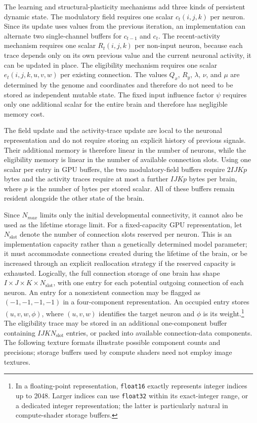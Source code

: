 \documentclass[12pt,a4paper]{article}
\begin{document}
	The learning and structural-plasticity mechanisms add three kinds of persistent dynamic state. The modulatory field requires one scalar $c_t(i,j,k)$ per neuron. Since its update uses values from the previous iteration, an implementation can alternate two single-channel buffers for $c_{t-1}$ and $c_t$. The recent-activity mechanism requires one scalar $R_t(i,j,k)$ per non-input neuron, because each trace depends only on its own previous value and the current neuronal activity, it can be updated in place. The eligibility mechanism requires one scalar $e_t(i,j,k,u,v,w)$ per existing connection. The values $Q_x$, $R_y$, $\lambda$, $\nu$, and $\mu$ are determined by the genome and coordinates and therefore do not need to be stored as independent mutable state. The fixed input influence factor $\psi$ requires only one additional scalar for the entire brain and therefore has negligible memory cost.

	The field update and the activity-trace update are local to the neuronal representation and do not require storing an explicit history of previous signals. Their additional memory is therefore linear in the number of neurons, while the eligibility memory is linear in the number of available connection slots. Using one scalar per entry in GPU buffers, the two modulatory-field buffers require $2IJKp$ bytes and the activity traces require at most a further $IJKp$ bytes per brain, where $p$ is the number of bytes per stored scalar. All of these buffers remain resident alongside the other state of the brain.

	Since $N_{max}$ limits only the initial developmental connectivity, it cannot also be used as the lifetime storage limit. For a fixed-capacity GPU representation, let $N_{\mathrm{slot}}$ denote the number of connection slots reserved per neuron. This is an implementation capacity rather than a genetically determined model parameter; it must accommodate connections created during the lifetime of the brain, or be increased through an explicit reallocation strategy if the reserved capacity is exhausted. Logically, the full connection storage of one brain has shape $I \times J \times K \times N_{\mathrm{slot}}$, with one entry for each potential outgoing connection of each neuron. An entry for a nonexistent connection may be flagged as $(-1,-1,-1,-1)$ in a four-component representation. An occupied entry stores $(u,v,w,\phi)$, where $(u,v,w)$ identifies the target neuron and $\phi$ is its weight.\footnote{In a floating-point representation, \texttt{float16} exactly represents integer indices up to 2048. Larger indices can use \texttt{float32} within its exact-integer range, or a dedicated integer representation; the latter is particularly natural in compute-shader storage buffers.} The eligibility trace may be stored in an additional one-component buffer containing $IJKN_{\mathrm{slot}}$ entries, or packed into available connection-data components. The following texture formats illustrate possible component counts and precisions; storage buffers used by compute shaders need not employ image textures.
	
\end{document}
